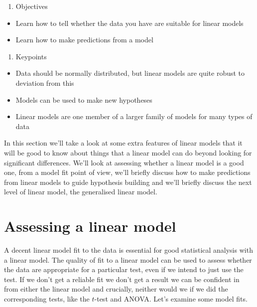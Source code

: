 \documentclass[
]{book}
\providecommand{\tightlist}{%
  \setlength{\itemsep}{0pt}\setlength{\parskip}{0pt}}
\begin{document}
\begin{enumerate}
\def\labelenumi{\arabic{enumi}.}
\setcounter{enumi}{1}
\tightlist
\item
  Objectives
\end{enumerate}

\begin{itemize}
\tightlist
\item
  Learn how to tell whether the data you have are suitable for linear models
\item
  Learn how to make predictions from a model
\end{itemize}

\begin{enumerate}
\def\labelenumi{\arabic{enumi}.}
\setcounter{enumi}{2}
\tightlist
\item
  Keypoints
\end{enumerate}

\begin{itemize}
\tightlist
\item
  Data should be normally distributed, but linear models are quite robust to deviation from this
\item
  Models can be used to make new hypotheses
\item
  Linear models are one member of a larger family of models for many types of data
\end{itemize}

In this section we'll take a look at some extra features of linear models that it will be good to know about things that a linear model can do beyond looking for significant differences. We'll look at assessing whether a linear model is a good one, from a model fit point of view, we'll briefly discuss how to make predictions from linear models to guide hypothesis building and we'll briefly discuss the next level of linear model, the generalised linear model.

\hypertarget{assessing-a-linear-model}{%
\section{Assessing a linear model}\label{assessing-a-linear-model}}

A decent linear model fit to the data is essential for good statistical analysis with a linear model. The quality of fit to a linear model can be used to assess whether the data are appropriate for a particular test, even if we intend to just use the test. If we don't get a reliable fit we don't get a result we can be confident in from either the linear model and crucially, neither would we if we did the corresponding tests, like the \(t\)-test and ANOVA. Let's examine some model fits.
\end{document}
